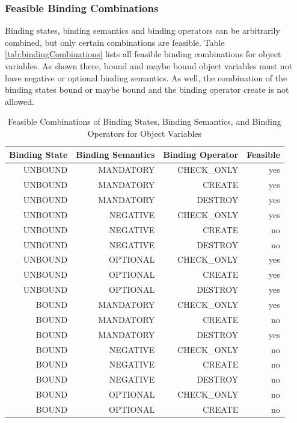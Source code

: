 \subsubsection{Feasible Binding Combinations}

Binding states, binding semantics and binding operators can be
arbitrarily combined, but only certain combinations are feasible. 
Table \ref{tab:bindingCombinations} lists all feasible binding combinations for
object variables. As shown there, bound and maybe bound object variables must not have negative
or optional binding semantics. As well, the combination of the binding states
bound or maybe bound and the binding operator create is not allowed.

\begin{table}[htbp]
  \centering
  \caption{Feasible Combinations of Binding States, Binding Semantics, and
  Binding Operators for Object Variables}
    \begin{tabular}{|r|r|r|r|}
    \hline
    \textbf{Binding State} & \textbf{Binding Semantics} & \textbf{Binding
    Operator} & \textbf{Feasible} \\
    \hline
    UNBOUND & MANDATORY & CHECK\_ONLY & yes \\
    UNBOUND & MANDATORY & CREATE & yes \\
    UNBOUND & MANDATORY & DESTROY & yes \\
    UNBOUND & NEGATIVE & CHECK\_ONLY & yes \\
    UNBOUND & NEGATIVE & CREATE & no \\
    UNBOUND & NEGATIVE & DESTROY & no \\
    UNBOUND & OPTIONAL & CHECK\_ONLY & yes \\
    UNBOUND & OPTIONAL & CREATE & yes \\
    UNBOUND & OPTIONAL & DESTROY & yes \\
    \hline
    BOUND & MANDATORY & CHECK\_ONLY & yes \\
    BOUND & MANDATORY & CREATE & no \\
    BOUND & MANDATORY & DESTROY & yes \\
    BOUND & NEGATIVE & CHECK\_ONLY & no \\
    BOUND & NEGATIVE & CREATE & no \\
    BOUND & NEGATIVE & DESTROY & no \\
    BOUND & OPTIONAL & CHECK\_ONLY & no \\
    BOUND & OPTIONAL & CREATE & no \\

\end{tabular}
\end{table}
